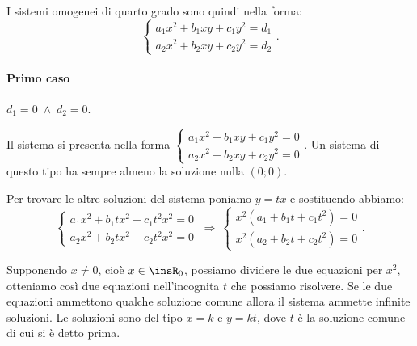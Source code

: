 I sistemi omogenei di quarto grado sono quindi nella forma:
\begin{equation*}
\left\{\begin{array}{l}{a_1x^2+b_1xy+c_1y^2=d_1}\\{a_2x^2+b_2xy+c_2y^2=d_2}\end{array}\right..
\end{equation*}
\paragraph{Primo caso} $d_1=0 \;\wedge\; d_2=0$.

Il sistema si presenta nella forma $\left\{\begin{array}{l}{a_1x^2+b_1xy+c_1y^2=0}\\{a_2x^2+b_2xy+c_2y^2=0}\end{array}\right.$. Un sistema di questo tipo ha sempre almeno la soluzione nulla $(0;0)$.

Per trovare le altre soluzioni del sistema poniamo $y=tx$ e sostituendo abbiamo: \[ \left\{\begin{array}{l}{a_1x^2+b_1tx^2+c_1t^2x^2=0}\\{a_2x^2+b_2tx^2+c_2t^2x^2=0}\end{array}\right. \:\Rightarrow\: \left\{\begin{array}{l}{x^2(a_1+b_1t+c_1t^2)=0}\\{x^2(a_2+b_2t+c_2t^2)=0}\end{array}\right.. \]

Supponendo $x\neq 0$, cioè $x\in \insR_0$, possiamo dividere le due equazioni per $x^2$, otteniamo così due equazioni nell'incognita $t$ che possiamo risolvere. Se le due equazioni ammettono qualche soluzione comune allora il sistema ammette infinite soluzioni. Le soluzioni sono del tipo $x=k$ e $y={kt}$, dove $t$ è la soluzione comune di cui si è detto prima.

